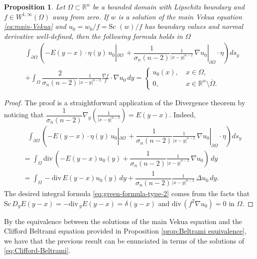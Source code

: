 \documentclass[12pt]{article}
\newtheorem{proposition}[theorem]{Proposition}
\def\div{\mbox{div}\,}
\def\R{\mathbb{R}}
\def\Sc{\mbox{Sc}\,}
\begin{document}
\begin{proposition}\label{prop:integral-Cauchy}
Let $\Omega\subset \mathbb{R}^n$ be a bounded domain with Lipschitz boundary and $f\in W^{1,\infty}(\Omega)$ away from zero. If $w$ is a solution of the main Vekua equation \eqref{eq:main-Vekua} and $u_0=w_0/f=\text{Sc }(w)/f$ has boundary values and normal derivative well-defined, then the following formula holds in $\Omega$
\begin{align}\label{eq:green-formula-type-2}
&\int_{\partial \Omega} \left(-E(y-x)\cdot \eta(y)\, u_0|_{\partial\Omega}\,+\dfrac{1}{\sigma_n(n-2)}\frac{1}{|x-y|^{n-2}}\, \nabla u_0 |_{\partial\Omega}\cdot \eta\right) ds_{y}\nonumber\\
&+\int_{\Omega} \dfrac{2}{\sigma_n(n-2)}\frac{1}{|x-y|^{n-2}}\frac{\nabla f}{f}\cdot \nabla u_0 \, dy=\left\{
   \begin{array}{ll}
      u_0(x), \ & x\in \Omega,\\
      0,           & x\in \R^n\setminus \overline{\Omega}.
   \end{array}
\right.
\end{align}
\end{proposition}
\begin{proof}
The proof is a straightforward application of the Divergence theorem by noticing that $\dfrac{1}{\sigma_n(n-2)}\nabla_y\left(\frac{1}{|x-y|^{n-2}}\right)=E(y-x)$. Indeed,
\begin{align*}
&\text{ }\int_{\partial \Omega} \left(-E(y-x)\cdot \eta(y)\, u_0|_{\partial\Omega}\,+\dfrac{1}{\sigma_n(n-2)}\frac{1}{|x-y|^{n-2}}\, \nabla u_0 |_{\partial\Omega}\cdot \eta\right) ds_{y}\\
&=\int_{\Omega}\div\left(-E(y-x) u_0(y)+\dfrac{1}{\sigma_n(n-2)}\frac{1}{|x-y|^{n-2}}\, \nabla u_0\right)\, dy\\
&=\int_{\Omega} -\div E(y-x) u_0(y)\, dy+\dfrac{1}{\sigma_n(n-2)}\frac{1}{|x-y|^{n-2}}\, \Delta u_0 \, dy.
\end{align*}
The desired integral formula \eqref{eq:green-formula-type-2} comes from the facts that $\Sc D_yE(y-x)=-\div_y E(y-x)=\delta(y-x)$ and $\div(f^2\nabla u_0)=0$ in $\Omega$. %
\end{proof}
By the equivalence between the solutions of the main Vekua equation and the Clifford Beltrami equation provided in Proposition \ref{prop:Beltrami equivalence}, we have that the previous result can be enunciated in terms of the solutions of \eqref{eq:Clifford-Beltrami}. 
\end{document}
